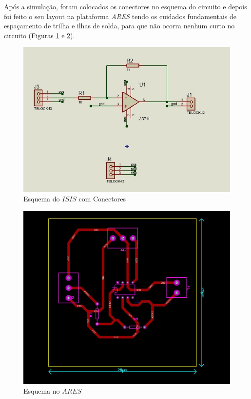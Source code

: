 \documentclass[14pt, oneside]{book}
\newcommand\tab[1][1cm]{\hspace*{#1}}
\theoremstyle{definition}
\begin{document}
                \tab Após a simulação, foram colocados os conectores no esquema do circuito e depois foi feito o seu layout na plataforma \textit{ARES} tendo os cuidados fundamentais de espaçamento de trilha e ilhas de solda, para que não ocorra nenhum curto no circuito (Figuras \ref{novo} e \ref{dale}). \\
                \begin{figure}[H]
                    \centering
                    \includegraphics[scale= 0.46]{circuito(tblock).jpeg}
                    \caption{Esquema do $ISIS$ com Conectores}
                    \label{novo}
                \end{figure}
                \begin{figure}[H]
                    \centering
                    \includegraphics[scale= 0.25]{circuito(proteus).jpeg}
                    \caption{Esquema no $ARES$}
                    \label{dale}
                \end{figure} \\
\end{document}
